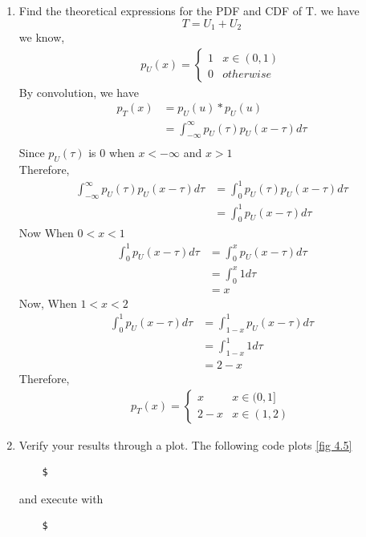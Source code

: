 \documentclass[journal,12pt,twocolumn]{IEEEtran}
\renewcommand\thesection{\arabic{section}}
\begin{document}
\begin{enumerate}[label=\thesection.\arabic*.,ref=\thesection.\theenumi]
\begin{figure}[H]
        \label{fig 4.3}
    \end{figure}
    \item Find the theoretical expressions for the PDF and CDF of T.
    \solution we have
    \begin{equation}
        T=U_1+U_2
    \end{equation}
    we know,
    \begin{align}
        p_U(x) = \begin{cases}
        1 & x \in (0,1) \\
        0 & otherwise
    \end{cases} 
    \end{align}
    By convolution, we have
    \begin{align}
        p_T(x)&=p_U(u)*p_U(u) \\
        &=\int_{-\infty}^{\infty} p_U(\tau)p_U(x-\tau)d\tau \\
    \end{align}
    Since $p_U(\tau)$ is 0 when $x < -\infty$ and $x>1$ \\
    Therefore,
    \begin{align}
        \int_{-\infty}^{\infty} p_U(\tau)p_U(x-\tau)d\tau &= \int_{0}^{1} p_U(\tau)p_U(x-\tau)d\tau \\
        &=\int_{0}^{1}p_U(x-\tau)d\tau
    \end{align}
    Now When $0<x<1$ \\
    \begin{align}
        \int_{0}^{1} p_U(x-\tau)d\tau &= \int_{0}^{x}p_U(x-\tau)d\tau \\
        &= \int_{0}^{x}1d\tau \\
        &= x
    \end{align}
    Now, When $1<x<2$ \\
    \begin{align}
        \int_{0}^{1} p_U(x-\tau)d\tau &= \int_{1-x}^{1}p_U(x-\tau)d\tau \\
        &= \int_{1-x}^{1}1d\tau \\
        &= 2-x
    \end{align}
    Therefore,
    \begin{align}
        p_T(x)=\begin{cases}
            x & x \in (0,1] \\
            2-x & x \in (1,2)
        \end{cases}
    \end{align}
    

    \item Verify your results through a plot. 
    \solution 
    The following code plots \ref{fig 4.5}
    \begin{lstlisting}
    $    
    \end{lstlisting}
    and execute with
    \begin{lstlisting}
    $
    \end{lstlisting}


\end{enumerate}
\end{document}

